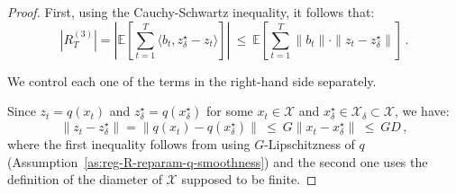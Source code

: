 \documentclass[a4paper,11pt,fullpage]{article}
\def\X{{\mathcal X}}
\theoremstyle{plain}
\theoremstyle{definition}
\theoremstyle{plain}
\renewcommand{\leq}{~\le~}
\begin{document}
\begin{proof}
First, using the Cauchy-Schwartz inequality, it follows that: 
\begin{equation}
\label{eq:ics-bias}
|R_T^{(3)}| = \left| \mathbb{E}\left[ \sum_{t=1}^T \langle b_t, z_{\delta}^{\star} - z_t  \rangle \right]\right|
\leq \mathbb{E}\left[ \sum_{t=1}^T \|b_t\| \cdot \|z_t - z_{\delta}^{\star}\| \right]\,. 
\end{equation}

We control each one of the terms in the right-hand side separately.

Since $z_t = q(x_t)$ and $z_{\delta}^{\star} = q(x_{\delta}^{\star})$ for some  $x_t \in \X$ and $x_{\delta}^{\star} \in \X_{\delta} \subset \X$, we have: 
\begin{equation}
\label{eq:bias-proof2}
\|z_t - z_{\delta}^{\star}\| = \|q(x_t) - q(x_{\delta}^{\star})\| \leq G \|x_t - x_{\delta}^{\star}\| \leq GD\,,
\end{equation}
where the first inequality follows from using $G$-Lipschitzness of $q$ (Assumption~\ref{as:reg-R-reparam-q-smoothness}) and the second one uses the definition of the diameter of $\X$ supposed to be finite.  


\end{proof}
\end{document}
